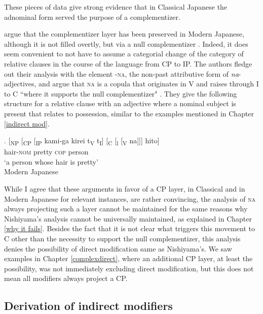 \documentclass [output=book,colorlinks,citecolor=brown]{langscibook}
\begin{document}
These pieces of data give strong evidence that in Classical Japanese the adnominal form served the purpose of a complementizer.

\citet{kaplan:1995:the} argue that the complementizer layer has been preserved in Modern Japanese, although it is not filled overtly, but via a null complementizer \citep[33–35]{kaplan:1995:the}. Indeed, it does seem convenient to not have to assume a categorial change of the category of relative clauses in the course of the language from CP to IP. The authors fledge out their analysis with the element -\textsc{na}, the non-past attributive form of \textit{na}-adjectives, and argue that \textsc{na} is a copula that originates in V and raises through I to C ``where it supports the null complementizer" \citep[34]{kaplan:1995:the}. They give the following structure for a relative clause with an adjective where a nominal subject is present that relates to possession, similar to the examples mentioned in Chapter \ref{indirect mod}. %

\exg. [\textsubscript{NP} [\textsubscript{CP} [\textsubscript{IP} kami-ga kirei t\textsubscript{V} t\textsubscript{I}] [\textsubscript{C} [\textsubscript{l} [\textsubscript{V} na]]] hito]\\
{} {} {} hair-\textsc{nom} pretty {} {} {} {} {} \textsc{cop} person\\
`a person whose hair is pretty' \\ \null \hfill Modern Japanese \citep[34]{kaplan:1995:the}

While I agree that these arguments in favor of a CP layer, in Classical and in Modern Japanese for relevant instances, are rather convincing, the analysis of \textsc{na} always projecting such a layer cannot be maintained for the same reasons why Nishiyama’s analysis cannot be universally maintained, as explained in Chapter \ref{why it fails}. Besides the fact that it is not clear what triggers this movement to C other than the necessity to support the null complementizer, this analysis denies the possibility of direct modification same as Nishiyama’s. We saw examples in Chapter \ref{complexdirect}, where an additional CP layer, at least the possibility, was not immediately excluding direct modification, but this does not mean all modifiers always project a CP. %

\subsection{Derivation of indirect modifiers} \label{operator}
\end{document}
